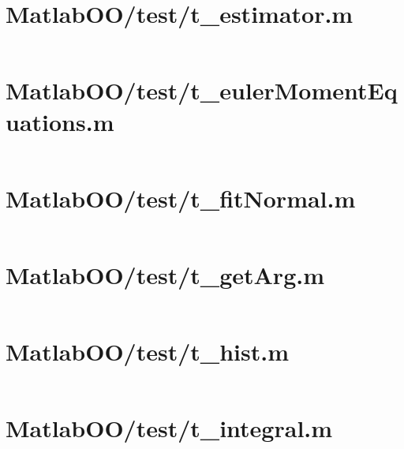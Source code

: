 \pagebreak
\section*{MatlabOO/test/t\_estimator.m}\label{code:MatlabOO/test/t_estimator.m}
\inputminted[linenos,fontsize=\scriptsize]{matlab}{/home/dcouture/git/mathyourlife/TSatPy/beta_versions/matlab_object_oriented/test/t_estimator.m}

\pagebreak
\section*{MatlabOO/test/t\_eulerMomentEquations.m}\label{code:MatlabOO/test/t_eulerMomentEquations.m}
\inputminted[linenos,fontsize=\scriptsize]{matlab}{/home/dcouture/git/mathyourlife/TSatPy/beta_versions/matlab_object_oriented/test/t_eulerMomentEquations.m}

\pagebreak
\section*{MatlabOO/test/t\_fitNormal.m}\label{code:MatlabOO/test/t_fitNormal.m}
\inputminted[linenos,fontsize=\scriptsize]{matlab}{/home/dcouture/git/mathyourlife/TSatPy/beta_versions/matlab_object_oriented/test/t_fitNormal.m}

\pagebreak
\section*{MatlabOO/test/t\_getArg.m}\label{code:MatlabOO/test/t_getArg.m}
\inputminted[linenos,fontsize=\scriptsize]{matlab}{/home/dcouture/git/mathyourlife/TSatPy/beta_versions/matlab_object_oriented/test/t_getArg.m}

\pagebreak
\section*{MatlabOO/test/t\_hist.m}\label{code:MatlabOO/test/t_hist.m}
\inputminted[linenos,fontsize=\scriptsize]{matlab}{/home/dcouture/git/mathyourlife/TSatPy/beta_versions/matlab_object_oriented/test/t_hist.m}

\pagebreak
\section*{MatlabOO/test/t\_integral.m}\label{code:MatlabOO/test/t_integral.m}
\inputminted[linenos,fontsize=\scriptsize]{matlab}{/home/dcouture/git/mathyourlife/TSatPy/beta_versions/matlab_object_oriented/test/t_integral.m}

